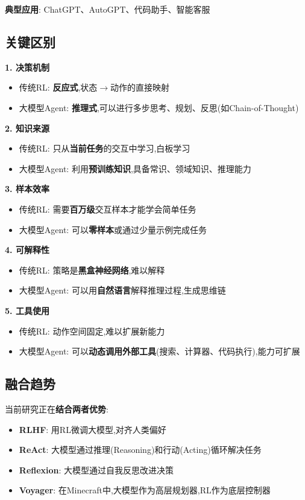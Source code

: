\documentclass[UTF8]{ctexart}
\begin{document}
\textbf{典型应用}: ChatGPT、AutoGPT、代码助手、智能客服

\subsection{关键区别}

\textbf{1. 决策机制}
\begin{itemize}
    \item 传统RL: \textbf{反应式},状态$\rightarrow$动作的直接映射
    \item 大模型Agent: \textbf{推理式},可以进行多步思考、规划、反思(如Chain-of-Thought)
\end{itemize}

\textbf{2. 知识来源}
\begin{itemize}
    \item 传统RL: 只从\textbf{当前任务}的交互中学习,白板学习
    \item 大模型Agent: 利用\textbf{预训练知识},具备常识、领域知识、推理能力
\end{itemize}

\textbf{3. 样本效率}
\begin{itemize}
    \item 传统RL: 需要\textbf{百万级}交互样本才能学会简单任务
    \item 大模型Agent: 可以\textbf{零样本}或通过少量示例完成任务
\end{itemize}

\textbf{4. 可解释性}
\begin{itemize}
    \item 传统RL: 策略是\textbf{黑盒神经网络},难以解释
    \item 大模型Agent: 可以用\textbf{自然语言}解释推理过程,生成思维链
\end{itemize}

\textbf{5. 工具使用}
\begin{itemize}
    \item 传统RL: 动作空间固定,难以扩展新能力
    \item 大模型Agent: 可以\textbf{动态调用外部工具}(搜索、计算器、代码执行),能力可扩展
\end{itemize}

\subsection{融合趋势}

当前研究正在\textbf{结合两者优势}:
\begin{itemize}
    \item \textbf{RLHF}: 用RL微调大模型,对齐人类偏好
    \item \textbf{ReAct}: 大模型通过推理(Reasoning)和行动(Acting)循环解决任务
    \item \textbf{Reflexion}: 大模型通过自我反思改进决策
    \item \textbf{Voyager}: 在Minecraft中,大模型作为高层规划器,RL作为底层控制器
\end{itemize}
\end{document}
